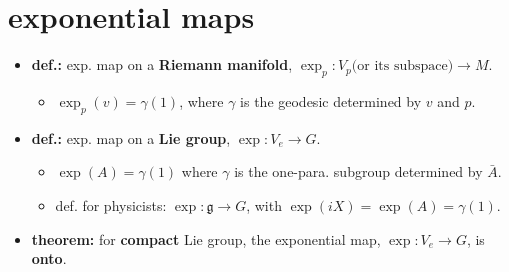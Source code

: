 \section{exponential maps}
\begin{itemize}
	\item \textbf{def.:} exp. map on a \textbf{Riemann manifold}, $\exp_p: V_p \text{(or its subspace)} \rightarrow M$.
	\begin{itemize}
		\item $\exp_p(v) = \gamma(1)$, where $\gamma$ is the geodesic determined by $v$ and $p$.
	\end{itemize}
	
	\item \textbf{def.:} exp. map on a \textbf{Lie group}, $\exp: V_e \rightarrow G$.
	\begin{itemize}
		\item $\exp(A) = \gamma(1)$ where $\gamma$ is the one-para. subgroup determined by $\bar{A}$.
		
		\item def. for physicists: $\exp: \mathfrak{g} \rightarrow G$, with $\exp(i X) = \exp(A) = \gamma(1)$.
	\end{itemize}
	
	\item \textbf{theorem:} for \textbf{compact} Lie group, the exponential map, $\exp : V_e \rightarrow G$, is \textbf{onto}.
\end{itemize}

